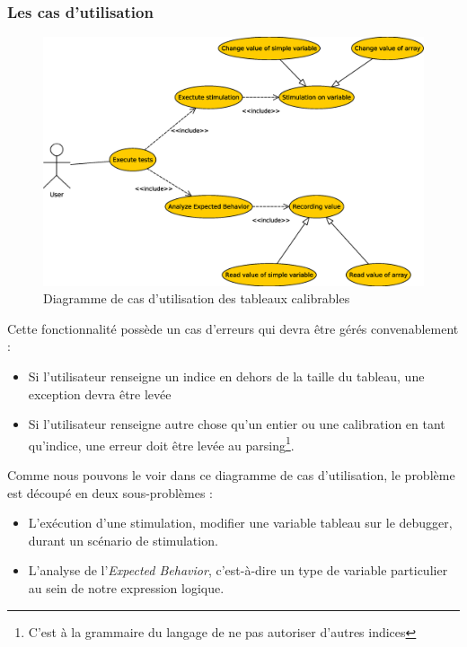 \subsubsection{Les cas d'utilisation}
\begin{figure}[H]
\centering
\includegraphics[width=18cm]{contents/images/usecasearray.eps}
\caption{Diagramme de cas d'utilisation des tableaux calibrables}
\end{figure}
\begin{remarque}
Cette fonctionnalité possède un cas d'erreurs qui devra être gérés convenablement : 
\begin{itemize}
\item Si l'utilisateur renseigne un indice en dehors de la taille du tableau, une exception devra être levée
\item Si l'utilisateur renseigne autre chose qu'un entier ou une calibration en tant qu'indice, une erreur doit être levée au parsing\footnote{C'est à la grammaire du langage de ne pas autoriser d'autres indices}.
 \end{itemize}
 \end{remarque}
 
 Comme nous pouvons le voir dans ce diagramme de cas d'utilisation, le problème est découpé en deux sous-problèmes : 
 \begin{itemize}
 	\item L'exécution d'une stimulation, modifier une variable tableau sur le debugger, durant un scénario de stimulation. 
 	\item L'analyse de l'\textit{Expected Behavior}, c'est-à-dire un type de variable particulier au sein de notre expression logique.
 \end{itemize}
 

